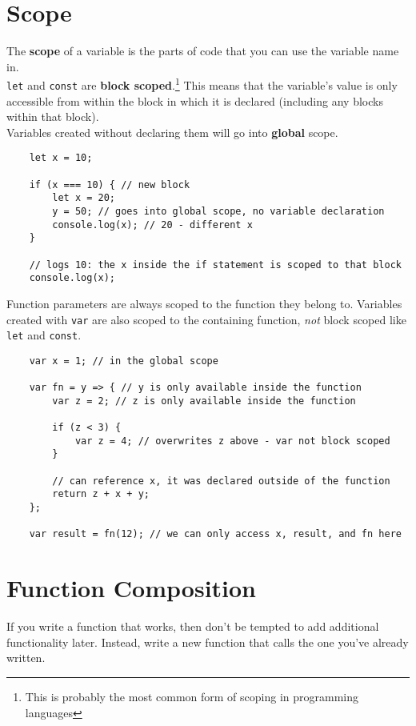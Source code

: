 \section{Scope}

The \textbf{scope} of a variable is the parts of code that you can use the variable name in.
\\

\texttt{let} and \texttt{const} are \textbf{block scoped}.\footnote{This is probably the most common form of scoping in programming languages} This means that the variable's value is only accessible from within the block in which it is declared (including any blocks within that block).
\\

Variables created without declaring them will go into \textbf{global} scope.

\begin{verbatim}
    let x = 10;

    if (x === 10) { // new block
        let x = 20;
        y = 50; // goes into global scope, no variable declaration
        console.log(x); // 20 - different x
    }

    // logs 10: the x inside the if statement is scoped to that block
    console.log(x);
\end{verbatim}

Function parameters are always scoped to the function they belong to. Variables created with \texttt{var} are also scoped to the containing function, \textit{not} block scoped like \texttt{let} and \texttt{const}.

\begin{verbatim}
    var x = 1; // in the global scope

    var fn = y => { // y is only available inside the function
        var z = 2; // z is only available inside the function

        if (z < 3) {
            var z = 4; // overwrites z above - var not block scoped
        }

        // can reference x, it was declared outside of the function
        return z + x + y;
    };

    var result = fn(12); // we can only access x, result, and fn here
\end{verbatim}


\section{Function Composition}
If you write a function that works, then don't be tempted to add additional functionality later. Instead, write a new function that calls the one you've already written.
\\

